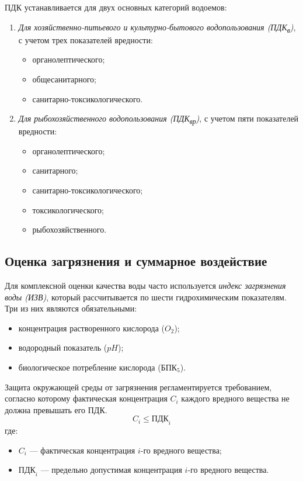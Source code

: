 ПДК устанавливается для двух основных категорий водоемов:
\begin{enumerate}
    \item \textit{Для хозяйственно-питьевого и культурно-бытового водопользования (ПДК\textsubscript{в})}, с учетом трех показателей вредности:
          \begin{itemize}
              \item органолептического;
              \item общесанитарного;
              \item санитарно-токсикологического.
          \end{itemize}

    \item \textit{Для рыбохозяйственного водопользования (ПДК\textsubscript{вр})}, с учетом пяти показателей вредности:
          \begin{itemize}
              \item органолептического;
              \item санитарного;
              \item санитарно-токсикологического;
              \item токсикологического;
              \item рыбохозяйственного.
          \end{itemize}
\end{enumerate}

\subsection*{Оценка загрязнения и суммарное воздействие}

Для комплексной оценки качества воды часто используется \textit{индекс загрязнения воды (ИЗВ)}, который рассчитывается по шести гидрохимическим показателям. Три из них являются обязательными:
\begin{itemize}
    \item концентрация растворенного кислорода ($O_2$);
    \item водородный показатель ($pH$);
    \item биологическое потребление кислорода ($БПК_5$).
\end{itemize}

Защита окружающей среды от загрязнения регламентируется требованием, согласно которому фактическая концентрация $C_i$ каждого вредного вещества не должна превышать его ПДК.
$$
    C_i \le \text{ПДК}_i
$$
где:
\begin{itemize}
    \item $C_i$ — фактическая концентрация $i$-го вредного вещества;
    \item $\text{ПДК}_i$ — предельно допустимая концентрация $i$-го вредного вещества.
\end{itemize}

